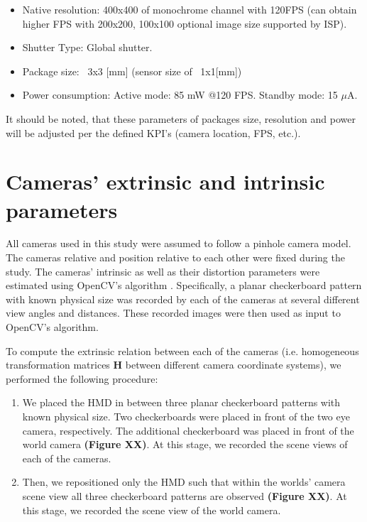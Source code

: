 \documentclass{article}
\begin{document}
\begin{enumerate}
   \begin{itemize}
     \item Native resolution: 400x400 of monochrome channel with 120FPS (can obtain higher FPS with 200x200, 100x100 optional image size supported by ISP).
     \item Shutter Type: Global shutter.
     \item Package size: ~3x3 [mm] (sensor size of ~1x1[mm])
     \item Power consumption: Active mode: 85 mW @120 FPS. Standby mode: 15 $\mu$A.
   \end{itemize}
\end{enumerate}

It should be noted, that these parameters of packages size, resolution and power will be adjusted per the defined KPI's (camera location, FPS, etc.).      

\section{Cameras' extrinsic and intrinsic parameters}
All cameras used in this study were assumed to follow a pinhole camera model. The cameras relative and position relative to each other were fixed during the study.  The cameras' intrinsic as well as their distortion parameters were estimated using OpenCV's algorithm \cite{opencv_library}.  Specifically, a planar checkerboard pattern with known physical size was recorded by each of the cameras at several different view angles and distances.  These recorded images were then used as input to OpenCV's algorithm.

To compute the extrinsic relation between each of the cameras (i.e. homogeneous transformation matrices $\mathbf{H}$ between different camera coordinate systems), we performed the following procedure: 
\begin{enumerate}[label=(\alph*)]
    \item We placed the HMD in between three planar checkerboard patterns with known physical size. Two checkerboards were placed in front of the two eye camera, respectively. The additional checkerboard was placed in front of the world camera \textbf{(Figure XX)}. At this stage, we recorded the scene views of each of the cameras.
    \item Then, we repositioned only the HMD such that within the worlds' camera scene view all three checkerboard patterns are observed \textbf{(Figure XX)}.  At this stage, we recorded the scene view of the world camera.
\end{enumerate}
\end{document}
